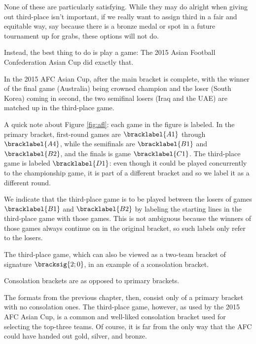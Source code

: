 {    None of these are particularly satisfying. While they may do alright when giving out third-place isn't important, if we really want to assign third in a fair and equitable way, say because there is a bronze medal or spot in a future tournament up for grabs, these options will not do.

    Instead, the best thing to do is play a game: The 2015 Asian Football Confederation Asian Cup \cite{wiki_afc} did exactly that.


    In the 2015 AFC Asian Cup, after the main bracket is complete, with the winner of the final game (Australia) being crowned champion and the loser (South Korea) coming in second, the two semifinal losers (Iraq and the UAE) are matched up in the third-place game.

    A quick note about Figure \ref{fig:afl}: each game in the figure is labeled. In the primary bracket, first-round games are $\bracklabel{A1}$ through $\bracklabel{A4}$, while the semifinals are $\bracklabel{B1}$ and $\bracklabel{B2}$, and the finals is game $\bracklabel{C1}$. The third-place game is labeled $\bracklabel{D1}$: even though it could be played concurrently to the championship game, it is part of a different bracket and so we label it as a different round.

    We indicate that the third-place game is to be played between the losers of games $\bracklabel{B1}$ and $\bracklabel{B2}$ by labeling the starting lines in the third-place game with those games. This is not ambiguous because the winners of those games always continue on in the original bracket, so such labels only refer to the losers.

    The third-place game, which can also be viewed as a two-team bracket of signature $\bracksig{2;0}$, in an example of a \i{consolation bracket}.


    Consolation brackets are as opposed to \i{primary brackets}.


    The formats from the previous chapter, then, consist only of a primary bracket with no consolation ones. The third-place game, however, as used by the 2015 AFC Asian Cup, is a common and well-liked consolation bracket used for selecting the top-three teams. Of course, it is far from the only way that the AFC could have handed out gold, silver, and bronze.
    
}

